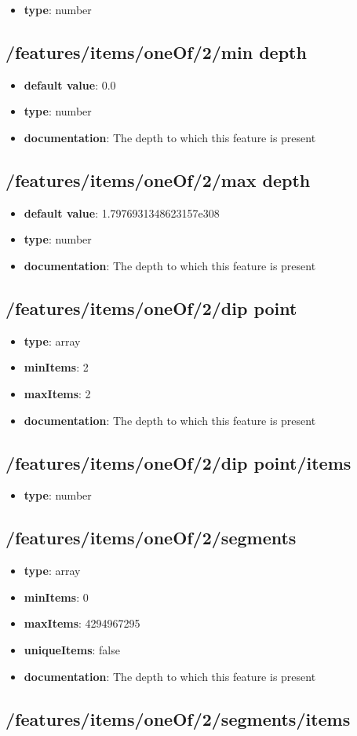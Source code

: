 \begin{itemize}\item {\bf type}: number
\end{itemize}\subsection{/features/items/oneOf/2/min depth}
\begin{itemize}\item {\bf default value}: 0.0
\item {\bf type}: number
\item {\bf documentation}: The depth to which this feature is present
\end{itemize}\subsection{/features/items/oneOf/2/max depth}
\begin{itemize}\item {\bf default value}: 1.7976931348623157e308
\item {\bf type}: number
\item {\bf documentation}: The depth to which this feature is present
\end{itemize}\subsection{/features/items/oneOf/2/dip point}
\begin{itemize}\item {\bf type}: array
\item {\bf minItems}: 2
\item {\bf maxItems}: 2
\item {\bf documentation}: The depth to which this feature is present
\end{itemize}\subsection{/features/items/oneOf/2/dip point/items}
\begin{itemize}\item {\bf type}: number
\end{itemize}\subsection{/features/items/oneOf/2/segments}
\begin{itemize}\item {\bf type}: array
\item {\bf minItems}: 0
\item {\bf maxItems}: 4294967295
\item {\bf uniqueItems}: false
\item {\bf documentation}: The depth to which this feature is present
\end{itemize}\subsection{/features/items/oneOf/2/segments/items}
